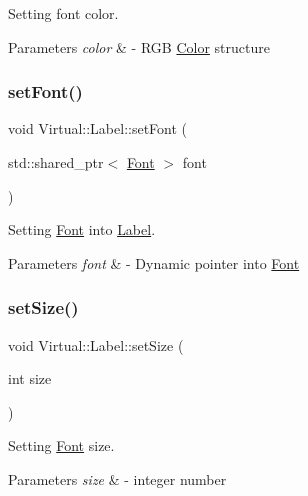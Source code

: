 Setting font color. 


\begin{DoxyParams}{Parameters}
{\em color} & -\/ R\+GB \hyperlink{struct_virtual_1_1_color}{Color} structure \\
\hline
\end{DoxyParams}
\hypertarget{class_virtual_1_1_label_a643dca9416c60c78b1b1fc234ed6964c}{}\label{class_virtual_1_1_label_a643dca9416c60c78b1b1fc234ed6964c} 
\subsubsection{\texorpdfstring{set\+Font()}{setFont()}}
{\footnotesize\ttfamily void Virtual\+::\+Label\+::set\+Font (\begin{DoxyParamCaption}\item[{std\+::shared\+\_\+ptr$<$ \hyperlink{class_virtual_1_1_font}{Font} $>$}]{font }\end{DoxyParamCaption})}



Setting \hyperlink{class_virtual_1_1_font}{Font} into \hyperlink{class_virtual_1_1_label}{Label}. 


\begin{DoxyParams}{Parameters}
{\em font} & -\/ Dynamic pointer into \hyperlink{class_virtual_1_1_font}{Font} \\
\hline
\end{DoxyParams}
\hypertarget{class_virtual_1_1_label_a20e22a03b54b9851ad675c491df1ae75}{}\label{class_virtual_1_1_label_a20e22a03b54b9851ad675c491df1ae75} 
\subsubsection{\texorpdfstring{set\+Size()}{setSize()}}
{\footnotesize\ttfamily void Virtual\+::\+Label\+::set\+Size (\begin{DoxyParamCaption}\item[{int}]{size }\end{DoxyParamCaption})}



Setting \hyperlink{class_virtual_1_1_font}{Font} size. 


\begin{DoxyParams}{Parameters}
{\em size} & -\/ integer number \\
\hline
\end{DoxyParams}
\hypertarget{class_virtual_1_1_label_a1b737a96ea06f214120c61dc2465536f}{}\label{class_virtual_1_1_label_a1b737a96ea06f214120c61dc2465536f} 
